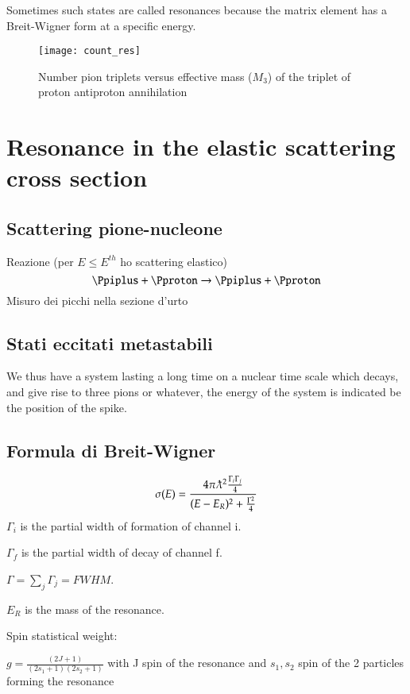 \documentclass[main.tex]{subfiles}
\begin{document}
Sometimes such states are called resonances because the matrix element has a Breit-Wigner form at a specific energy.


\begin{figure}[!ht]
\centering
\texttt{[image: count\_res]}
\caption{Number pion triplets versus effective mass ($M_3$) of the triplet of proton antiproton annihilation}
\label{fig:count_res}
\end{figure}

\clearpage

\section{Resonance in the elastic scattering cross section}

\subsection{Scattering pione-nucleone}
Reazione (per $E\leq E^{th}$ ho scattering elastico)
\begin{equation*}
\Ppiplus+\Pproton\rightarrow\Ppiplus+\Pproton
\end{equation*}
Misuro dei picchi nella sezione d'urto

\subsection{Stati eccitati metastabili}
We thus have a system lasting a long time on a nuclear time scale which decays, and give rise to three pions or whatever, the energy of the system is indicated be the position of the spike.

\subsection{Formula di Breit-Wigner}
\begin{equation*}
\sigma(E)=\frac{4\pi\lambdabar^2\frac{\Gamma_i\Gamma_j}{4}}{(E-E_R)^2+\frac{\Gamma^2}{4}}
\end{equation*}
$\Gamma_i$ is the partial width of formation of channel i.

$\Gamma_f$ is the partial width of decay of channel f.

$\Gamma=\sum_j\Gamma_j=FWHM$.

$E_R$ is the mass of the resonance.

Spin statistical weight:

$g=\frac{(2J+1)}{(2s_1+1)(2s_2+1)}$ with J spin of the resonance and $s_1, s_2$ spin of the 2 particles forming the resonance
\end{document}
